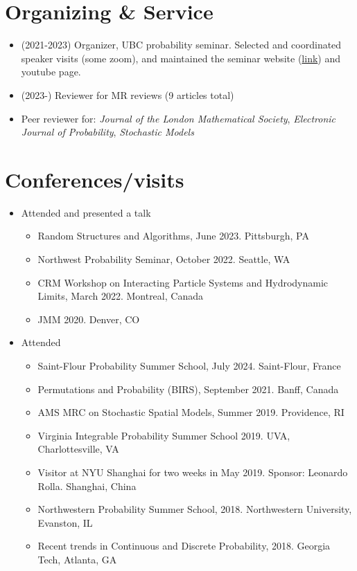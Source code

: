 \documentclass[letterpaper]{article}
\begin{document}
\section*{Organizing \& Service} 
\begin{itemize} 
  \item (2021-2023) Organizer, UBC probability seminar. Selected and coordinated speaker visits (some zoom), and maintained the seminar website (\href{https://secure.math.ubc.ca/Links/ProbSeminar/}{link}) and youtube page. 
  \item (2023-) Reviewer for MR reviews (9 articles total)
  \item Peer reviewer for: {\em{Journal of the London Mathematical Society}}, {\em{Electronic Journal of Probability}}, {\em{Stochastic Models}}  
  \end{itemize}

\section*{Conferences/visits}
\begin{itemize} \item Attended and presented a talk
\begin{itemize} 

 \item Random Structures and Algorithms, June 2023. Pittsburgh, PA
 \item Northwest Probability Seminar, October 2022. Seattle, WA
 \item CRM Workshop on Interacting Particle Systems and Hydrodynamic Limits, March 2022. Montreal, Canada
 \item JMM 2020. Denver, CO
 \end{itemize}
 
 \item Attended
 \begin{itemize}
 \item Saint-Flour Probability Summer School, July 2024. Saint-Flour, France
 \item Permutations and Probability (BIRS), September 2021. Banff, Canada

 \item AMS MRC on Stochastic Spatial Models, Summer 2019. Providence, RI
 \item Virginia Integrable Probability Summer School 2019. UVA, Charlottesville, VA
 \item Visitor at NYU Shanghai for two weeks in May 2019. Sponsor: Leonardo Rolla. Shanghai, China
 \item Northwestern Probability Summer School, 2018. Northwestern University, Evanston, IL
 \item Recent trends in Continuous and Discrete Probability, 2018. Georgia Tech, Atlanta, GA
\end{itemize}
\end{itemize}
\end{document}
